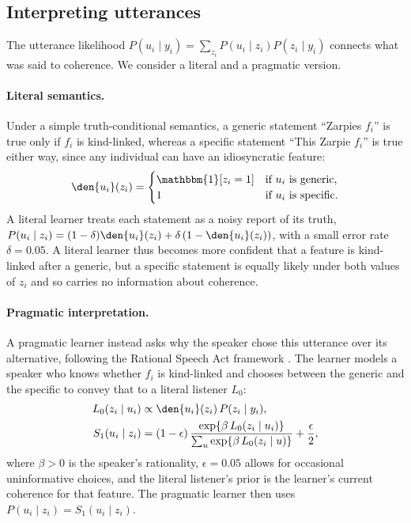 \subsection{Interpreting utterances}
\label{sec:utterances}

The utterance likelihood $P(u_i \mid y_i) = \sum_{z_i} P(u_i \mid z_i) P(z_i \mid y_i)$
connects what was said to coherence. We consider a literal and a pragmatic
version.

\paragraph{Literal semantics.} Under a simple truth-conditional semantics, a
generic statement ``Zarpies $f_i$'' is true only if $f_i$ is kind-linked, whereas
a specific statement ``This Zarpie $f_i$'' is true either way, since any
individual can have an idiosyncratic feature:
\begin{equation}
    \den{u_i}(z_i) = \begin{cases}
        \mathbbm{1}[z_i = 1] & \text{if } u_i \text{ is generic,} \\
        1 & \text{if } u_i \text{ is specific.}
    \end{cases}
\end{equation}
A literal learner treats each statement as a noisy report of its truth,
$P(u_i \mid z_i) = (1 - \delta)\den{u_i}(z_i) + \delta\,(1 - \den{u_i}(z_i))$,
with a small error rate $\delta = 0.05$. A literal learner thus becomes more
confident that a feature is kind-linked after a generic, but a specific
statement is equally likely under both values of $z_i$ and so carries no
information about coherence.

\paragraph{Pragmatic interpretation.} A pragmatic learner instead asks why the
speaker chose this utterance over its alternative, following the Rational Speech
Act framework \citep{goodmanfrank2016pragmaticlanguage}. The learner models a
speaker who knows whether $f_i$ is kind-linked and chooses between the generic
and the specific to convey that to a literal listener $L_0$:
\begin{align}
    L_0(z_i \mid u_i) &\propto \den{u_i}(z_i)\, P(z_i \mid y_i), \\
    S_1(u_i \mid z_i) &= (1 - \epsilon)\,
        \frac{\exp\{\beta\, L_0(z_i \mid u_i)\}}{\sum_{u} \exp\{\beta\, L_0(z_i \mid u)\}}
        + \frac{\epsilon}{2},
    \label{eq:speaker}
\end{align}
where $\beta > 0$ is the speaker's rationality, $\epsilon = 0.05$ allows for
occasional uninformative choices, and the literal listener's prior is the
learner's current coherence for that feature.
The pragmatic learner then uses $P(u_i \mid z_i) = S_1(u_i \mid z_i)$.


